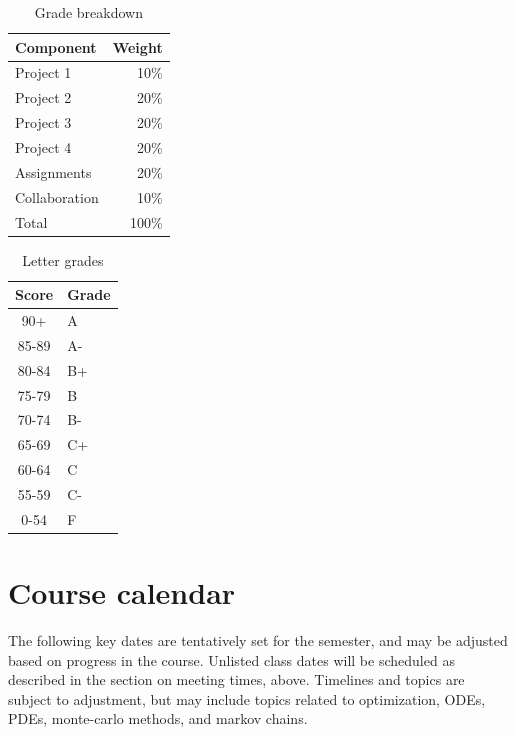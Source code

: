 \documentclass[12pt]{article}
\begin{document}
\begin{table}[htbp]
  \caption{Grade breakdown}
\begin{center}
  \begin{tabular}{lr}
    \toprule
    Component & Weight \\
    \midrule
    Project 1 & 10\% \\
    Project 2 & 20\% \\
    Project 3 & 20\% \\
    Project 4 & 20\% \\
    Assignments & 20\% \\
    Collaboration & 10\% \\
    \midrule
    Total & 100\% \\
    \bottomrule
  \end{tabular}
\end{center}
\end{table}

\begin{table}[htbp]
  \caption{Letter grades}
\begin{center}
  \begin{tabular}{cl}
	\toprule
	Score & Grade \\
	\midrule
	90+     &         A \\
   85-89    &         A-\\
   80-84    &         B+\\
   75-79    &         B	\\
   70-74    &         B-\\
   65-69    &         C+\\
   60-64    &         C	\\
   55-59    &         C-\\
   0-54    &         F \\
   \bottomrule
  \end{tabular}
\end{center}
\end{table}

\section*{Course calendar}
The following key dates are tentatively set for the semester, and may be adjusted based on progress in the course. Unlisted class dates will be scheduled as described in the section on meeting times, above. Timelines and topics are subject to adjustment, but may include topics related to optimization, ODEs, PDEs, monte-carlo methods, and markov chains.
\end{document}
